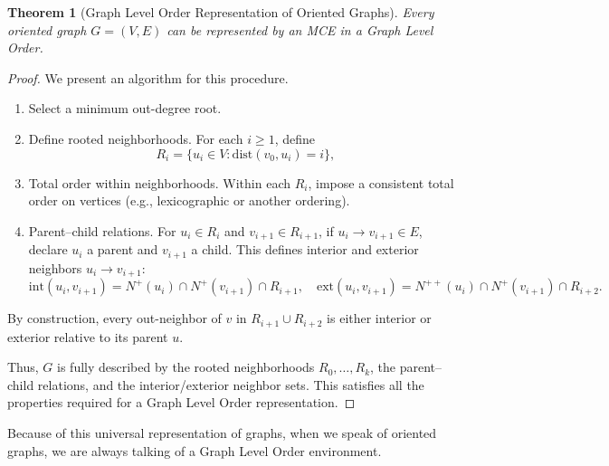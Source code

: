 \documentclass[AMS, Times1COL]{article} %
\newtheorem{theorem}{Theorem}[section]
\theoremstyle{definition}
\begin{document}
	\begin{theorem}[Graph Level Order Representation of Oriented Graphs]\label{gloverrep}
		Every oriented graph $G = (V,E)$ can be represented by an MCE in a Graph Level Order. \end{theorem}
	\begin{proof}
		We present an algorithm for this procedure.
		\begin{enumerate}
			\item Select a minimum out-degree root. 
			\item Define rooted neighborhoods. For each $i \ge 1$, define $$ R_i = \{ u_i \in V : \text{dist}(v_0, u_i) = i \}, $$
			\item Total order within neighborhoods. Within each $R_i$, impose a consistent total order on vertices (e.g., lexicographic or another ordering).
			\item Parent–child relations. For $u_i \in R_i$ and $v_{i+1} \in R_{i+1}$, if $u_i \to v_{i+1} \in E$, declare $u_i$ a parent and $v_{i+1}$ a child. This defines interior and exterior neighbors $u_i \to v_{i+1}$: $$ \text{int}(u_i,v_{i+1}) = N^+(u_i) \cap N^+(v_{i+1}) \cap R_{i+1}, \quad \text{ext}(u_i,v_{i+1}) = N^{++}(u_i) \cap N^+(v_{i+1}) \cap R_{i+2}. $$
		\end{enumerate}
		By construction, every out-neighbor of $v$ in $R_{i+1} \cup R_{i+2}$ is either interior or exterior relative to its parent $u$.
		
		\medskip Thus, $G$ is fully described by the rooted neighborhoods $R_0, \dots, R_k$, the parent–child relations, and the interior/exterior neighbor sets. This satisfies all the properties required for a Graph Level Order representation.
	\end{proof}
	
	Because of this universal representation of graphs, when we speak of oriented graphs, we are always talking of a Graph Level Order environment.
	
	
	
\end{document}
